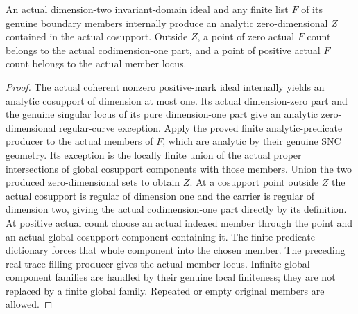 \begin{theorem}
\label{hir:general-two-curve-special-exception}
\leanok
An actual dimension-two invariant-domain ideal and any finite list $F$ of
its genuine boundary members internally produce an analytic zero-dimensional
$Z$ contained in the actual cosupport. Outside $Z$, a point of zero actual
$F$ count belongs to the actual codimension-one part, and a point of positive
actual $F$ count belongs to the actual member locus.
\end{theorem}
\begin{proof}
The actual coherent nonzero positive-mark ideal internally yields an
analytic cosupport of dimension at most one. Its actual dimension-zero
part and the genuine singular locus of its pure dimension-one part give
an analytic zero-dimensional regular-curve exception. Apply the proved
finite analytic-predicate producer to the actual members of $F$, which
are analytic by their genuine SNC geometry. Its exception is the locally
finite union of the actual proper intersections of global cosupport
components with those members. Union the two produced zero-dimensional
sets to obtain $Z$. At a cosupport point outside $Z$ the actual cosupport
is regular of dimension one and the carrier is regular of dimension two,
giving the actual codimension-one part directly by its definition. At
positive actual count choose an actual indexed member through the point
and an actual global cosupport component containing it. The finite-predicate
dictionary forces that whole component into the chosen member. The preceding
real trace filling producer gives the actual member locus. Infinite global
component families are handled by their genuine local finiteness; they are
not replaced by a finite global family. Repeated or empty original members
are allowed.
\end{proof}

